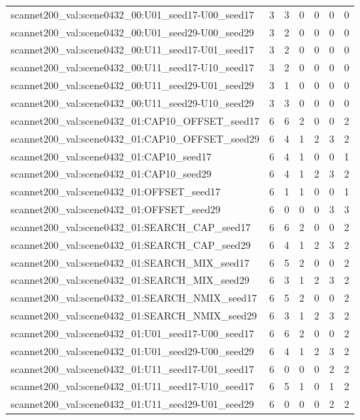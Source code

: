 \begin{table}[t]
\begin{tabular}{lrrrrrr}
scannet200\_val:scene0432\_00:U01\_seed17-U00\_seed17 & 3 & 3 & 0 & 0 & 0 & 0 \\
scannet200\_val:scene0432\_00:U01\_seed29-U00\_seed29 & 3 & 2 & 0 & 0 & 0 & 0 \\
scannet200\_val:scene0432\_00:U11\_seed17-U01\_seed17 & 3 & 2 & 0 & 0 & 0 & 0 \\
scannet200\_val:scene0432\_00:U11\_seed17-U10\_seed17 & 3 & 2 & 0 & 0 & 0 & 0 \\
scannet200\_val:scene0432\_00:U11\_seed29-U01\_seed29 & 3 & 1 & 0 & 0 & 0 & 0 \\
scannet200\_val:scene0432\_00:U11\_seed29-U10\_seed29 & 3 & 3 & 0 & 0 & 0 & 0 \\
scannet200\_val:scene0432\_01:CAP10\_OFFSET\_seed17 & 6 & 6 & 2 & 0 & 0 & 2 \\
scannet200\_val:scene0432\_01:CAP10\_OFFSET\_seed29 & 6 & 4 & 1 & 2 & 3 & 2 \\
scannet200\_val:scene0432\_01:CAP10\_seed17 & 6 & 4 & 1 & 0 & 0 & 1 \\
scannet200\_val:scene0432\_01:CAP10\_seed29 & 6 & 4 & 1 & 2 & 3 & 2 \\
scannet200\_val:scene0432\_01:OFFSET\_seed17 & 6 & 1 & 1 & 0 & 0 & 1 \\
scannet200\_val:scene0432\_01:OFFSET\_seed29 & 6 & 0 & 0 & 0 & 3 & 3 \\
scannet200\_val:scene0432\_01:SEARCH\_CAP\_seed17 & 6 & 6 & 2 & 0 & 0 & 2 \\
scannet200\_val:scene0432\_01:SEARCH\_CAP\_seed29 & 6 & 4 & 1 & 2 & 3 & 2 \\
scannet200\_val:scene0432\_01:SEARCH\_MIX\_seed17 & 6 & 5 & 2 & 0 & 0 & 2 \\
scannet200\_val:scene0432\_01:SEARCH\_MIX\_seed29 & 6 & 3 & 1 & 2 & 3 & 2 \\
scannet200\_val:scene0432\_01:SEARCH\_NMIX\_seed17 & 6 & 5 & 2 & 0 & 0 & 2 \\
scannet200\_val:scene0432\_01:SEARCH\_NMIX\_seed29 & 6 & 3 & 1 & 2 & 3 & 2 \\
scannet200\_val:scene0432\_01:U01\_seed17-U00\_seed17 & 6 & 6 & 2 & 0 & 0 & 2 \\
scannet200\_val:scene0432\_01:U01\_seed29-U00\_seed29 & 6 & 4 & 1 & 2 & 3 & 2 \\
scannet200\_val:scene0432\_01:U11\_seed17-U01\_seed17 & 6 & 0 & 0 & 0 & 2 & 2 \\
scannet200\_val:scene0432\_01:U11\_seed17-U10\_seed17 & 6 & 5 & 1 & 0 & 1 & 2 \\
scannet200\_val:scene0432\_01:U11\_seed29-U01\_seed29 & 6 & 0 & 0 & 0 & 2 & 2 \\

\end{tabular}
\end{table}
